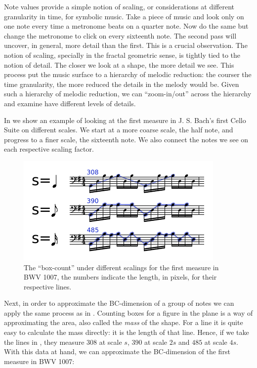 Note values provide a simple notion of scaling, or considerations at different
granularity in time, for symbolic music.
Take a piece of music and look only on one note every time a metronome
beats on a quarter note. Now do the same but change the metronome to
click on every sixteenth note. The second pass will uncover, in general,
more detail than the first. This is a crucial observation. The notion
of scaling, specially in the fractal geometric sense, is tightly tied
to the notion of detail. The closer we look at a shape, the more detail we see.
This process put the music surface to a hierarchy of melodic reduction: the
courser the time granularity, the more reduced the details in the melody would be. 
Given such a hierarchy of melodic reduction, we can ``zoom-in/out'' across the hierarchy and examine have different levels of details.

  In  we show an example of looking at the first
measure in J. S. Bach's first Cello Suite on different scales. We start at 
a more coarse scale, the half note, and progress to a finer scale, the sixteenth note.
We also connect the notes we see on each respective scaling factor.

\begin{figure}
  \includegraphics[width=\linewidth]{src/img/musical-scaling-example.pdf}
  \caption{The ``box-count'' under different scalings for the first measure in BWV 1007,
the numbers indicate the length, in pixels, for their respective lines.}
  \label{fig:egscalingmusic}
\end{figure}


  Next, in order to approximate the BC-dimension of a group of notes
we can apply the same process as in . Counting boxes for
a figure in the plane is a way of approximating the area, also called
the \emph{mass} of the shape. For a line it is quite easy to calculate
the mass directly: it is the length of that line. Hence, if we take 
the lines in , they measure $308$ at scale
$s$, $390$ at scale $2s$ and $485$ at scale $4s$. With this data
at hand, we can approximate the BC-dimension of the first measure in
BWV 1007:

